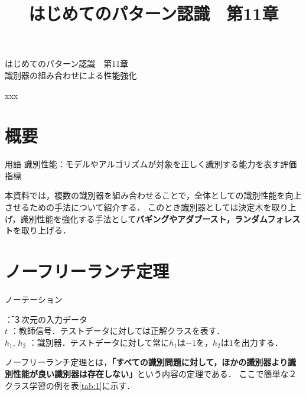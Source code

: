 \documentclass[dvipdfmx]{jreport}
\title{はじめてのパターン認識　第11章}
\begin{document}
\begin{center}{
        \large{はじめてのパターン認識　第11章}\\
        \Large{識別器の組み合わせによる性能強化}
}
\end{center}

\begin{flushright}
    xxx
\end{flushright}


\section{概要}
\begin{itembox}[l]{\large{用語}}
        \hspace{15pt} \raisebox{0.5ex}{\tiny $\bullet$} 識別性能：モデルやアルゴリズムが対象を正しく識別する能力を表す評価指標
\end{itembox}

本資料では，複数の識別器を組み合わせることで，全体としての識別性能を向上させるための手法について紹介する．
このとき識別器としては決定木を取り上げ，識別性能を強化する手法として\textbf{バギングやアダブースト，ランダムフォレスト}を取り上げる．

\section{ノーフリーランチ定理}

\begin{itembox}[l]{\large{ノーテーション}}
        \begin{tabbing}
            \hspace{15pt} \raisebox{0.5ex}{\tiny $\bullet$}  \hspace{17pt} \= ：３次元の入力データ \\[0.5em]
            \hspace{15pt} \raisebox{0.5ex}{\tiny $\bullet$} $t$      \> ：教師信号．テストデータに対しては正解クラスを表す．\\[0.5em]
            \hspace{15pt} \raisebox{0.5ex}{\tiny $\bullet$} $h_1$, $h_2$ \> ：識別器．テストデータに対して常に$h_1$は$-1$を，$h_2$は1を出力する．
        \end{tabbing}
\end{itembox}

ノーフリーランチ定理とは，\textbf{「すべての識別問題に対して，ほかの識別器より識別性能が良い識別器は存在しない」}という内容の定理である．
ここで簡単な２クラス学習の例を表\ref{tab:1}に示す．
\end{document}
